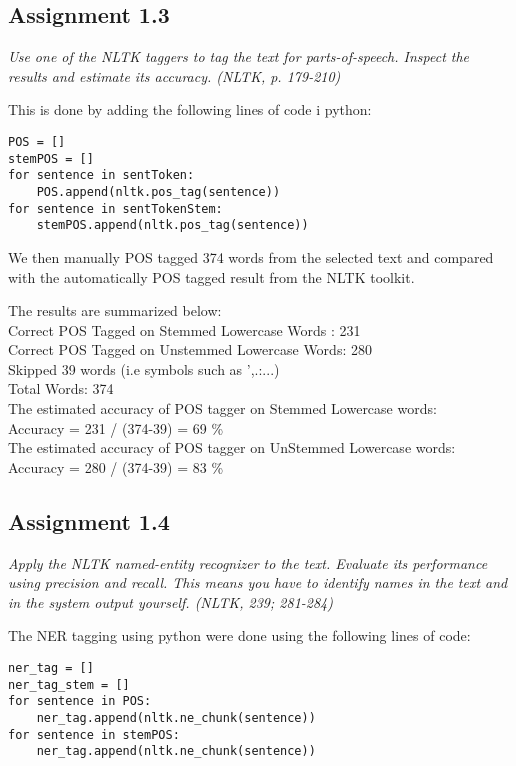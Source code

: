 \documentclass[a4paper]{article}
\begin{document}
\subsection{Assignment 1.3}
\textit{Use one of the NLTK taggers to tag the text for parts-of-speech. Inspect the results and estimate its accuracy. (NLTK, p. 179-210)}

This is done by adding the following lines of code i python:
\begin{verbatim}
POS = []
stemPOS = []
for sentence in sentToken:
    POS.append(nltk.pos_tag(sentence))
for sentence in sentTokenStem:
    stemPOS.append(nltk.pos_tag(sentence))
\end{verbatim} 

We then manually POS tagged 374 words from the selected text and compared with the automatically POS tagged result from the NLTK toolkit.

The results are summarized below: \\
Correct POS Tagged on Stemmed Lowercase Words  : 231 \\
Correct POS Tagged on Unstemmed Lowercase Words: 280 \\
Skipped 39 words (i.e symbols such as ',.:...) \\
Total Words: 374 \\
The estimated accuracy of POS tagger on Stemmed Lowercase words: \\
Accuracy = 231 / (374-39) = 69 \% \\
The estimated accuracy of POS tagger on UnStemmed Lowercase words: \\
Accuracy = 280 / (374-39) = 83 \% \\

\subsection{Assignment 1.4}
\textit{Apply the NLTK named-entity recognizer to the text. Evaluate
  its performance using precision and recall. This means you have to
  identify names in the text and in the system output yourself. (NLTK, 239; 281-284)}

The NER tagging using python were done using the following lines of code:

\begin{verbatim}
ner_tag = []
ner_tag_stem = []
for sentence in POS:
    ner_tag.append(nltk.ne_chunk(sentence))
for sentence in stemPOS:
    ner_tag.append(nltk.ne_chunk(sentence))
\end{verbatim}
\end{document}
